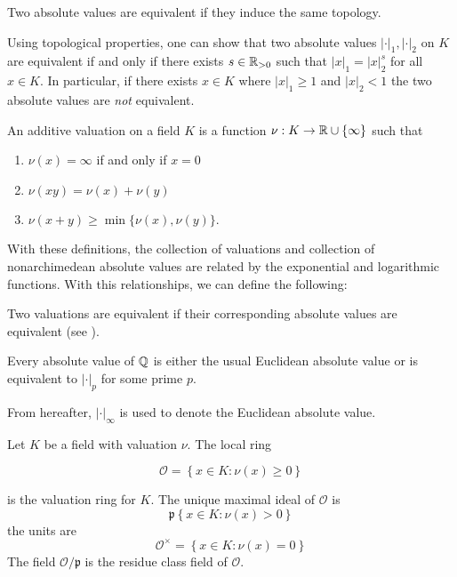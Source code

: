 \begin{definition}[Equivalent]
    Two absolute values are equivalent if they induce the same topology.
\end{definition}

Using topological properties, one can show that two absolute values $|\cdot|_1, |\cdot|_2$ on $K$ are equivalent if and only if there exists $s \in \mathbb{R}_{>0}$ such that $|x|_1 = |x|_2^s$ for all $x \in K$. In particular, if there exists $x \in K$ where $|x|_1 \geq 1$ and $|x|_2 < 1$ the two absolute values are \emph{not} equivalent.

\begin{definition}
    An additive valuation on a field $K$ is a function $\nu: K \to \mathbb{R} \cup \{\infty\}$ such that 
    \begin{enumerate}[(1)]
        \item $\nu(x) = \infty$ if and only if  $x = 0$
        \item $\nu(xy) = \nu(x) + \nu(y)$
        \item $\nu(x+y) \geq \min\{\nu(x), \nu(y)\}$.
    \end{enumerate}
\end{definition}

With these definitions, the collection of valuations and collection of nonarchimedean absolute values are related by the exponential and logarithmic functions. With this relationships, we can define the following:

\begin{definition}
    Two valuations are equivalent if their corresponding absolute values are equivalent (see ).
\end{definition}

\begin{theorem}
    Every absolute value of $\mathbb{Q}$ is either the usual Euclidean absolute value or is equivalent to $|\cdot|_p$ for some prime $p$.
\end{theorem}

From hereafter, $|\cdot|_\infty$ is used to denote the Euclidean absolute value.

\begin{definition}
    Let $K$ be a field with valuation $\nu$. The local ring 

    \[ \mathcal{O} = \left\{x \in K: \nu(x) \geq 0\right\}\]

    is the valuation ring for $K$. The unique maximal ideal of $\mathcal{O}$ is 
        \[\mathfrak{p} \left\{x \in K: \nu(x) > 0\right\}\]
    the units are
        \[\mathcal{O}^\times = \left\{x \in K : \nu(x) = 0\right\}\]
    The field $\mathcal{O}/\mathfrak{p}$ is the residue class field of $\mathcal{O}$.
\end{definition}

